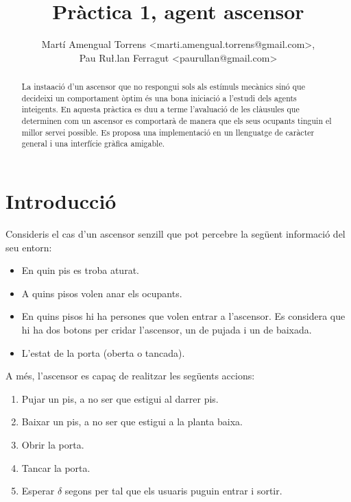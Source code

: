 \documentclass[a4paper, 11pt]{article}
\title{Pràctica 1, agent ascensor}
\author{
  Martí Amengual Torrens \small{<marti.amengual.torrens@gmail.com>}, \\
  Pau Ru\l.lan Ferragut \small{<paurullan@gmail.com>}
}
\begin{document}
\maketitle

\thispagestyle{empty}

\begin{abstract}
La insta\lgem ació d'un ascensor que no respongui sols als estímuls mecànics
sinó que decideixi un comportament òptim és una bona iniciació a l'estudi dels
agents inte\lgem igents. En aquesta pràctica es duu a terme l'avaluació de les
clàusules que determinen com un ascensor es comportarà de manera que els seus
ocupants tinguin el millor servei possible. Es proposa una implementació en un
llenguatge de caràcter general i una interfície gràfica amigable.
\end{abstract}

\newpage

\tableofcontents

\newpage

\section{Introducció}

Consideris el cas d'un ascensor senzill que pot percebre la següent informació
del seu entorn:

\begin{itemize}
  \item En quin pis es troba aturat.
  \item A quins pisos volen anar els ocupants.
  \item En quins pisos hi ha persones que volen entrar a l'ascensor. Es
    considera que hi ha dos botons per cridar l'ascensor, un de pujada i un de
    baixada.
  \item L'estat de la porta (oberta o tancada).
\end{itemize}

A més, l'ascensor es capaç de realitzar les següents accions:

\begin{enumerate}
  \item Pujar un pis, a no ser que estigui al darrer pis.
  \item Baixar un pis, a no ser que estigui a la planta baixa.
  \item Obrir la porta.
  \item Tancar la porta.
  \item Esperar $\delta$ segons per tal que els usuaris puguin entrar i sortir.
\end{enumerate} 
\end{document}
